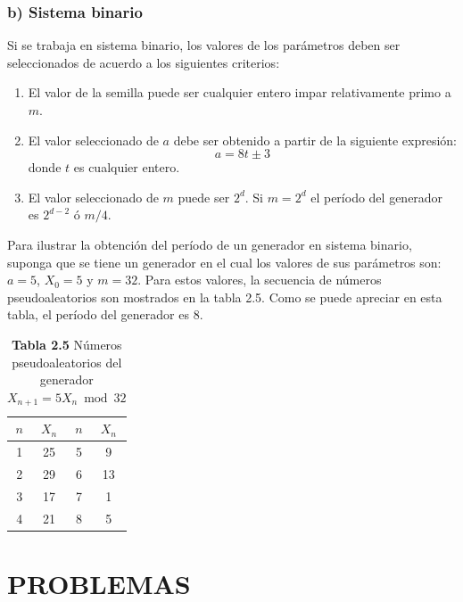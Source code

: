 \documentclass[11pt,letterpaper]{report}
\begin{document}
\subsubsection*{b) Sistema binario}

Si se trabaja en sistema binario, los valores de los parámetros deben
ser seleccionados de acuerdo a los siguientes criterios:

\begin{enumerate}
\item El valor de la semilla puede ser cualquier entero impar
relativamente primo a $m$.
\item El valor seleccionado de $a$ debe ser obtenido a partir de la
siguiente expresión:
\begin{equation}
a = 8t \pm 3
\end{equation}
donde $t$ es cualquier entero.
\item El valor seleccionado de $m$ puede ser $2^d$. Si $m=2^d$ el
período del generador es $2^{d-2}$ ó $m/4$.
\end{enumerate}

Para ilustrar la obtención del período de un generador en sistema
binario, suponga que se tiene un generador en el cual los valores de sus
parámetros son: $a=5$, $X_0=5$ y $m=32$. Para estos valores, la
secuencia de números pseudoaleatorios son mostrados en la tabla 2.5.
Como se puede apreciar en esta tabla, el período del generador es 8.

\begin{table}[H]
\centering
\caption*{\textbf{Tabla 2.5} Números pseudoaleatorios del generador $X_{n+1} = 5X_n \bmod 32$}
\begin{tabular}{cccc}
\toprule
$n$ & $X_n$ & $n$ & $X_n$ \\
\midrule
1 & 25 & 5 & 9 \\
2 & 29 & 6 & 13 \\
3 & 17 & 7 & 1 \\
4 & 21 & 8 & 5 \\
\bottomrule
\end{tabular}
\end{table}

\section*{PROBLEMAS}
\end{document}
